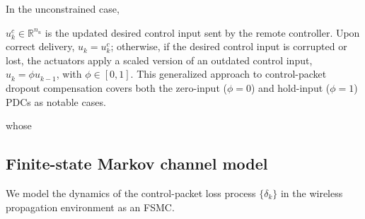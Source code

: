 \documentclass[journal,twoside,web]{ieeecolor}
\begin{document}





In the unconstrained case, 

$u_k^c\!\in\!\mathbb{R}^{n_u}$ is the updated desired control input sent by the remote controller. Upon correct delivery, $u_k^{}\!=\!u_k^c$; otherwise, if the desired control input is corrupted or lost, the actuators apply a scaled version of an outdated control input, $u_k^{}\!=\!\phi u_{k-1}^{}$, with $\phi \in [0,1]$.
This generalized approach to control-packet dropout compensation covers both the zero-input ($\phi\!=\!0$) and hold-input ($\phi\!=\!1$) PDCs as notable cases. 

whose 
\subsection{Finite-state Markov channel model}\label{subsec:fsmc}
We model the dynamics of the control-packet loss process $\{\delta_k\}$ in the wireless propagation environment as an FSMC. 
\end{document}

